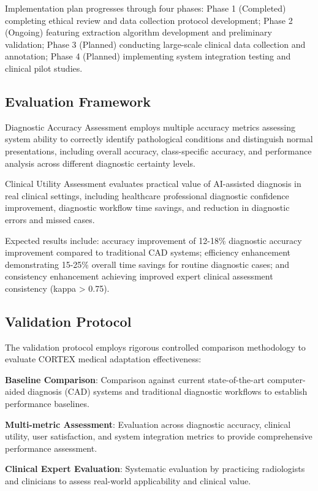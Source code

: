 Implementation plan progresses through four phases: Phase 1 (Completed) completing ethical review and data collection protocol development; Phase 2 (Ongoing) featuring extraction algorithm development and preliminary validation; Phase 3 (Planned) conducting large-scale clinical data collection and annotation; Phase 4 (Planned) implementing system integration testing and clinical pilot studies.

\subsection{Evaluation Framework}

Diagnostic Accuracy Assessment employs multiple accuracy metrics assessing system ability to correctly identify pathological conditions and distinguish normal presentations, including overall accuracy, class-specific accuracy, and performance analysis across different diagnostic certainty levels.

Clinical Utility Assessment evaluates practical value of AI-assisted diagnosis in real clinical settings, including healthcare professional diagnostic confidence improvement, diagnostic workflow time savings, and reduction in diagnostic errors and missed cases.

Expected results include: accuracy improvement of 12-18\% diagnostic accuracy improvement compared to traditional CAD systems; efficiency enhancement demonstrating 15-25\% overall time savings for routine diagnostic cases; and consistency enhancement achieving improved expert clinical assessment consistency (kappa > 0.75).

\subsection{Validation Protocol}

The validation protocol employs rigorous controlled comparison methodology to evaluate CORTEX medical adaptation effectiveness:

\textbf{Baseline Comparison}: Comparison against current state-of-the-art computer-aided diagnosis (CAD) systems and traditional diagnostic workflows to establish performance baselines.

\textbf{Multi-metric Assessment}: Evaluation across diagnostic accuracy, clinical utility, user satisfaction, and system integration metrics to provide comprehensive performance assessment.

\textbf{Clinical Expert Evaluation}: Systematic evaluation by practicing radiologists and clinicians to assess real-world applicability and clinical value.

